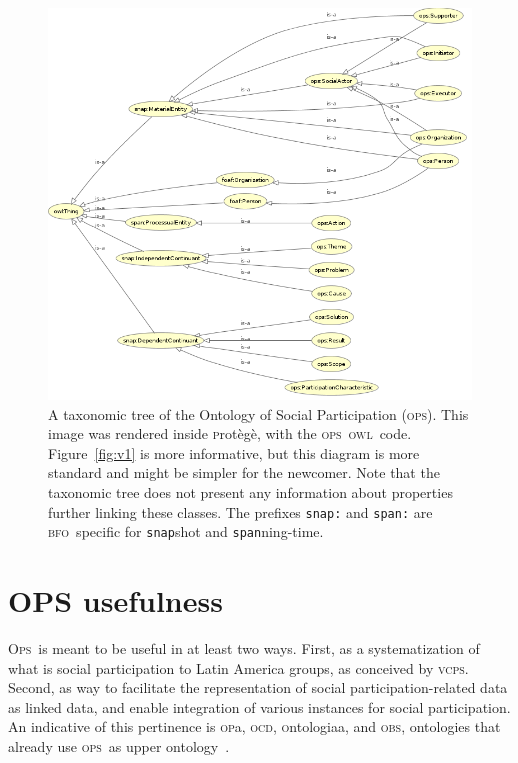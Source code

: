 \documentclass[10pt,letterpaper]{article}
\newcommand{\ops}{\textsc{ops}}
\newcommand{\opsi}{O\textsc{ps}}
\newcommand{\vcps}{\textsc{vcps}}
\newcommand{\owl}{\textsc{owl}}
\newcommand{\bfo}{\textsc{bfo}}
\newcommand{\opa}{\textsc{op}a}
\newcommand{\ocd}{\textsc{ocd}}
\newcommand{\ontologiaa}{\textsc{o}ntologiaa}
\newcommand{\obs}{\textsc{obs}}
\newcommand{\protege}{\textsc{p}rot\`eg\`e}
\begin{document}
\begin{figure}
    \centering
    \includegraphics[width=\textwidth]{figs/opsTax}
    \caption{A taxonomic tree of the Ontology of Social Participation (\ops).
    This image was rendered inside \protege, with the \ops\ \owl\ code.
    Figure~\ref{fig:v1} is more informative, but this diagram is more standard and might be simpler for the newcomer.
    Note that the taxonomic tree does not present any information about properties further linking these classes.
    The prefixes {\tt snap:} and {\tt span:} are \bfo\ specific for {\tt snap}shot and {\tt span}ning-time.}
    \label{fig:owlCC}
\end{figure}


\section{OPS usefulness}\label{ospUtil}
\opsi\ is meant to be useful in at least two ways.
First, as a systematization of what is social participation to Latin America groups,
as conceived by \vcps.
Second, as way to facilitate the representation of social participation-related data as linked data,
and enable integration of various instances for social participation.
An indicative of this pertinence is \opa, \ocd, \ontologiaa, and \obs,
ontologies that already use \ops\ as upper ontology~\cite{pnud5}.
\end{document}
